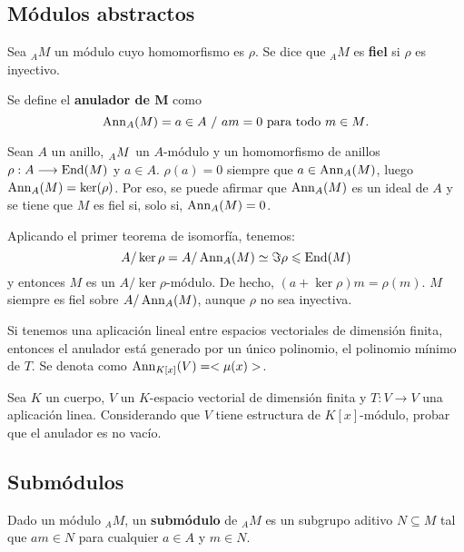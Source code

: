 \subsection{Módulos abstractos}

\begin{df}
  Sea \({}_AM\) un módulo cuyo homomorfismo es \(\rho\). Se dice que \({}_AM\) es
  \textbf{fiel} si \(\rho\) es inyectivo.
\end{df}
\begin{df}
  Se define el \textbf{anulador de M} como
  \[\operatorname{Ann}_A(M) = {a \in A \ /\ am = 0\ \text{para todo}\ m \in M}.\]
\end{df}

\begin{obs}
  Sean \(A\) un anillo, \(\prescript{}{A}{M}\) un \(A\)-módulo y
  un homomorfismo de anillos \(\rho:A\longrightarrow\operatorname{End}(M)\) y \(a \in A\).
  \(\rho(a) = 0\) siempre que \(a \in \operatorname{Ann}_A(M)\), luego \(\operatorname{Ann}_A(M) = \ker(\rho)\).
  Por eso, se puede afirmar que \(\operatorname{Ann}_A(M)\) es un ideal de \(A\) y se tiene que
  \(M\) es fiel si, solo si, \(\operatorname{Ann}_A(M) = {0}\).

  Aplicando el primer teorema de isomorfía, tenemos:
  \[
    A/\ker\rho = A/\operatorname{Ann}_A(M) \simeq \Im\rho \leqslant \operatorname{End}(M)
  \]
  \noindent y entonces \(M\) es un \(A/\ker\rho\)-módulo.
  De hecho, \((a+\ker\rho)m=\rho(m)\).
  \(M\) siempre es fiel sobre \(A/\operatorname{Ann}_A(M)\), aunque \(\rho\) no sea inyectiva.
\end{obs}

\begin{ejercicio}
  Si tenemos una aplicación lineal entre espacios vectoriales
  de dimensión finita, entonces el anulador está generado por un único
  polinomio, el polinomio mínimo de \(T\). Se denota como \(\operatorname{Ann}_{K[x]}(V) =
  < \mu(x) >\).
\end{ejercicio}

\begin{ejercicio}
  Sea \(K\) un cuerpo, \(V\) un \(K\)-espacio vectorial de dimensión finita y
  \(T:V \longrightarrow V\) una aplicación linea. Considerando que \(V\) tiene estructura
  de \(K[x]\)-módulo, probar que el anulador es no vacío.
\end{ejercicio}

\subsection{Submódulos}
\begin{df}
  Dado un módulo \({}_AM\), un \textbf{submódulo} de \({}_AM\)
  es un subgrupo aditivo \(N\subseteq M\)
  tal que \(am\in N\) para cualquier \(a\in A\) y \(m\in N\).
\end{df}

